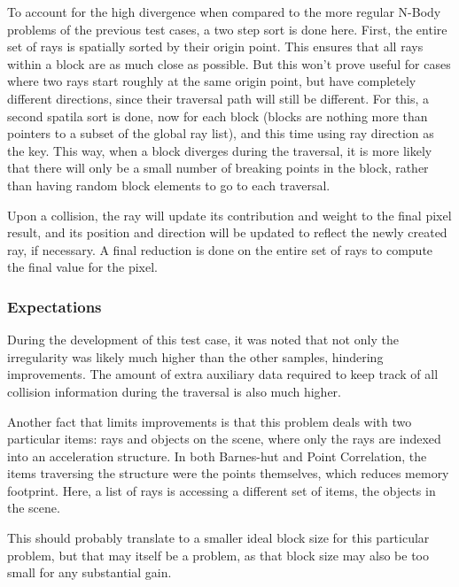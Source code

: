 To account for the high divergence when compared to the more regular N-Body problems of the previous test cases, a two step sort is done here. First, the entire set of rays is spatially sorted by their origin point. This ensures that all rays within a block are as much close as possible. But this won't prove useful for cases where two rays start roughly at the same origin point, but have completely different directions, since their traversal path will still be different. For this, a second spatila sort is done, now for each block (blocks are nothing more than pointers to a subset of the global ray list), and this time using ray direction as the key.
This way, when a block diverges during the traversal, it is more likely that there will only be a small number of breaking points in the block, rather than having random block elements to go to each traversal.

Upon a collision, the ray will update its contribution and weight to the final pixel result, and its position and direction will be updated to reflect the newly created ray, if necessary. A final reduction is done on the entire set of rays to compute the final value for the pixel.

\subsubsection{Expectations}

During the development of this test case, it was noted that not only the irregularity was likely much higher than the other samples, hindering improvements. The amount of extra auxiliary data required to keep track of all collision information during the traversal is also much higher.

Another fact that limits improvements is that this problem deals with two particular items: rays and objects on the scene, where only the rays are indexed into an acceleration structure. In both Barnes-hut and Point Correlation, the items traversing the structure were the points themselves, which reduces memory footprint. Here, a list of rays is accessing a different set of items, the objects in the scene.

This should probably translate to a smaller ideal block size for this particular problem, but that may itself be a problem, as that block size may also be too small for any substantial gain. 


